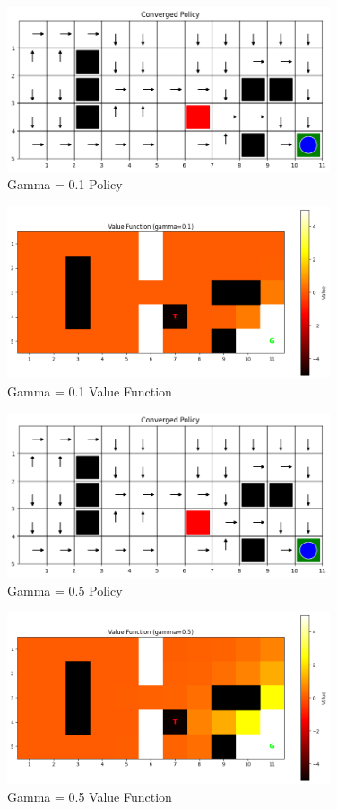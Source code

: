 \documentclass[12pt]{article}
\begin{document}
\begin{figure}[H]
  \centering
  \includegraphics[width=0.85\textwidth]{images/part2_q2_gamma_0.1_policy.png}
  \caption{Gamma = 0.1 Policy}
\end{figure}
\begin{figure}[H]
  \centering
  \includegraphics[width=0.85\textwidth]{images/part2_q2_gamma_0.1_value.png}
  \caption{Gamma = 0.1 Value Function}
\end{figure}

\begin{figure}[H]
  \centering
  \includegraphics[width=0.85\textwidth]{images/part2_q2_gamma_0.5_policy.png}
  \caption{Gamma = 0.5 Policy}
\end{figure}
\begin{figure}[H]
  \centering
  \includegraphics[width=0.85\textwidth]{images/part2_q2_gamma_0.5_value.png}
  \caption{Gamma = 0.5 Value Function}
\end{figure}
\end{document}
